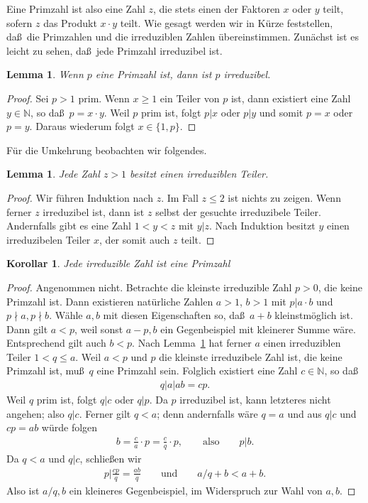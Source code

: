 \documentclass[10pt,reqno]{amsart}
\numberwithin{equation}{section}
\newcommand\NN{\mathbb N}
\newtheorem{lemma}[definition]{Lemma}
\newtheorem{corollary}[definition]{Korollar}
\newcommand\Lem{Lemma}
\begin{document}
Eine Primzahl ist also eine Zahl $z$, die stets einen der Faktoren $x$ oder $y$ teilt, sofern $z$ das Produkt $x\cdot y$ teilt.
Wie gesagt werden wir in K\"urze feststellen, da\ss\ die Primzahlen und die irreduziblen Zahlen \"ubereinstimmen.
Zun\"achst ist es leicht zu sehen, da\ss\ jede Primzahl irreduzibel ist.

\begin{lemma}\label{lem_prime1}
	Wenn $p$ eine Primzahl ist, dann ist $p$ irreduzibel.
\end{lemma}
\begin{proof}
	Sei $p>1$ prim.
	Wenn $x\geq1$ ein Teiler von $p$ ist, dann existiert eine Zahl $y\in\NN$, so da\ss\ $p=x\cdot y$.
	Weil $p$ prim ist, folgt $p|x$ oder $p|y$ und somit $p=x$ oder $p=y$.
	Daraus wiederum folgt $x\in\{1,p\}$.
\end{proof}

F\"ur die Umkehrung beobachten wir folgendes.

\begin{lemma}\label{lem_irred}
	Jede Zahl $z>1$ besitzt einen irreduziblen Teiler.
\end{lemma}
\begin{proof}
	Wir f\"uhren Induktion nach $z$.
	Im Fall $z\leq2$ ist nichts zu zeigen.
	Wenn ferner $z$ irreduzibel ist, dann ist $z$ selbst der gesuchte irreduzibele Teiler.
	Andernfalls gibt es eine Zahl $1<y<z$ mit $y|z$.
	Nach Induktion besitzt $y$ einen irreduzibelen Teiler $x$, der somit auch $z$ teilt.
\end{proof}

\begin{corollary}\label{cor_irred}
	Jede irreduzible Zahl ist eine Primzahl
\end{corollary}
\begin{proof}
	Angenommen nicht.
	Betrachte die kleinste irreduzible Zahl $p>0$, die keine Primzahl ist.
	Dann existieren nat\"urliche Zahlen $a>1$, $b>1$ mit $p|a\cdot b$ und $p\nmid a,p\nmid b$.
	W\"ahle $a,b$ mit diesen Eigenschaften so, da\ss\ $a+b$ kleinstm\"oglich ist.
	Dann gilt $a<p$, weil sonst $a-p,b$ ein Gegenbeispiel mit kleinerer Summe w\"are.
	Entsprechend gilt auch $b<p$.
	Nach \Lem~\ref{lem_irred} hat ferner $a$ einen irreduziblen Teiler $1<q\leq a$.
	Weil $a<p$ und $p$ die kleinste irreduzibele Zahl ist, die keine Primzahl ist, mu\ss\ $q$ eine Primzahl sein.
	Folglich existiert eine Zahl $c\in\NN$, so da\ss
	\begin{align*}
		q|a|ab=cp.
	\end{align*}
	Weil $q$ prim ist, folgt $q|c$ oder $q|p$.
	Da $p$ irreduzibel ist, kann letzteres nicht angehen; also $q|c$.
	Ferner gilt $q<a$; denn andernfalls w\"are $q=a$ und aus $q|c$ und $cp=ab$ w\"urde folgen
	\begin{align*}
		b=\frac ca\cdot p=\frac cq\cdot p,\qquad\mbox{also}\qquad p|b.
	\end{align*}
	Da $q<a$ und $q|c$, schlie\ss en wir
	\begin{align*}
		p|\frac{cp}q=\frac{ab}q\qquad\mbox{und}\qquad a/q+b<a+b.
	\end{align*}
	Also ist $a/q,b$ ein kleineres Gegenbeispiel, im Widerspruch zur Wahl von $a,b$.
\end{proof}
\end{document}
